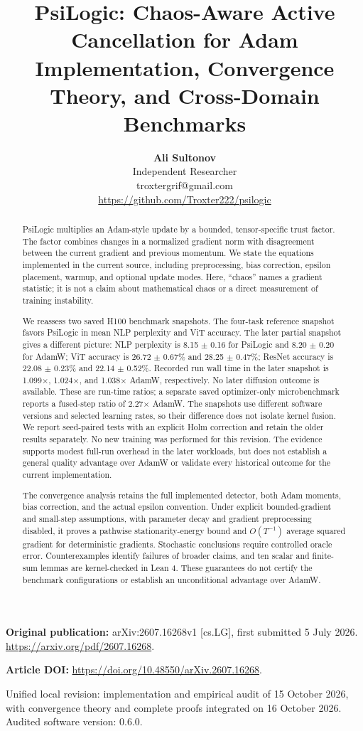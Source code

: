 \documentclass[11pt,a4paper]{article}
\title{PsiLogic: Chaos-Aware Active Cancellation for Adam\\\large Implementation, Convergence Theory, and Cross-Domain Benchmarks}
\author{\textbf{Ali Sultonov}\\Independent Researcher\\troxtergrif@gmail.com\\\url{https://github.com/Troxter222/psilogic}}
\date{}
\theoremstyle{definition}
\theoremstyle{remark}
\begin{document}
\maketitle
\textbf{Original publication:} arXiv:2607.16268v1 [cs.LG], first submitted 5 July 2026. \url{https://arxiv.org/pdf/2607.16268}.

\textbf{Article DOI:} \url{https://doi.org/10.48550/arXiv.2607.16268}.

Unified local revision: implementation and empirical audit of 15 October 2026, with convergence theory and complete proofs integrated on 16 October 2026. Audited software version: 0.6.0.

\begin{abstract}

PsiLogic multiplies an Adam-style update by a bounded, tensor-specific trust factor. The factor combines changes in a normalized gradient norm with disagreement between the current gradient and previous momentum. We state the equations implemented in the current source, including preprocessing, bias correction, epsilon placement, warmup, and optional update modes. Here, ``chaos'' names a gradient statistic; it is not a claim about mathematical chaos or a direct measurement of training instability.

We reassess two saved H100 benchmark snapshots. The four-task reference snapshot favors PsiLogic in mean NLP perplexity and ViT accuracy. The later partial snapshot gives a different picture: NLP perplexity is 8.15 \(\pm\) 0.16 for PsiLogic and 8.20 \(\pm\) 0.20 for AdamW; ViT accuracy is 26.72 \(\pm\) 0.67\% and 28.25 \(\pm\) 0.47\%; ResNet accuracy is 22.08 \(\pm\) 0.23\% and 22.14 \(\pm\) 0.52\%. Recorded run wall time in the later snapshot is 1.099\(\times\), 1.024\(\times\), and 1.038\(\times\) AdamW, respectively. No later diffusion outcome is available. These are run-time ratios; a separate saved optimizer-only microbenchmark reports a fused-step ratio of 2.27\(\times\) AdamW. The snapshots use different software versions and selected learning rates, so their difference does not isolate kernel fusion. We report seed-paired tests with an explicit Holm correction and retain the older results separately. No new training was performed for this revision. The evidence supports modest full-run overhead in the later workloads, but does not establish a general quality advantage over AdamW or validate every historical outcome for the current implementation.


The convergence analysis retains the full implemented detector, both Adam
moments, bias correction, and the actual epsilon convention. Under explicit
bounded-gradient and small-step assumptions, with parameter decay and gradient
preprocessing disabled, it proves a pathwise stationarity-energy bound and
$O(T^{-1})$ average squared gradient for deterministic gradients. Stochastic
conclusions require controlled oracle error. Counterexamples identify failures
of broader claims, and ten scalar and finite-sum lemmas are kernel-checked in
Lean 4. These guarantees do not certify the benchmark configurations or
establish an unconditional advantage over AdamW.

\end{abstract}
\end{document}
